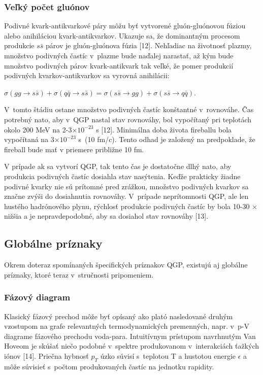\subsubsection{Veľký počet gluónov}
Podivné kvark-antikvarkové páry môžu byť vytvorené
gluón-gluónovou fúziou alebo anihiláciou kvark-antikvarkov.
Ukazuje sa, že dominantným
procesom produkcie $s\bar{s}$ párov je gluón-gluónova fúzia [12].
Nehľadiac na životnosť plazmy, množstvo podivných
častíc v~plazme bude naďalej narastať, až kým bude
množstvo podivných párov kvark-antikvark tak veľké, že
pomer produkcií podivných kvarkov-antikvarkov  sa vyrovná anihilácii:
\begin{center}
  $\sigma(gg \rightarrow s\bar{s}) + \sigma(q\bar{q} \rightarrow s\bar{s}) =
  \sigma(s\bar{s} \rightarrow gg) + \sigma(s\bar{s} \rightarrow q\bar{q})$.
\end{center}
V~tomto štádiu ostane množstvo podivných častíc
konštantné v~rovnováhe. Čas potrebný nato, aby v~QGP nastal
stav rovnováhy, bol vypočítaný pri teplotách okolo 200 MeV  na
2-3$\times 10^{-23}$ s [12]. Minimálna doba života fireballu bola
vypočítaná na  3$\times 10^{-23}$ s~(10 fm/c). Tento odhad
je založený na predpoklade, že fireball bude mať v
priemere približne 10 fm.

V prípade ak sa vytvorí QGP, tak
tento čas je dostatočne dlhý nato, aby produkcia podivných
častíc dosiahla stav nasýtenia.  Keďže prakticky
žiadne podivné kvarky nie sú prítomné pred zrážkou,
množstvo podivných kvarkov sa značne zvýši do dosiahnutia
rovnováhy. V~prípade neprítomnosti QGP, ale len hustého
hadrónového plynu, rýchlosť produkcie podivných častíc
by bola 10-30 $\times$ nižšia a je nepravdepodobné, aby sa dosiahol
stav rovnováhy [13].

\subsection{Globálne príznaky}
Okrem doteraz spomínaných špecifických príznakov QGP,
existujú aj globálne príznaky, ktoré teraz v~stručnosti
pripomeniem.
\subsubsection{Fázový diagram}
Klasický fázový prechod môže byť opísaný ako plató
nasledované druhým vzostupom na grafe relevantných termodynamických
premenných, napr. v~p-V diagrame fázového prechodu voda-para.
Intuitívnym prístupom navrhnutým Van Hoveom je skúšať
niečo podobné v~spektre produkovanom v~interakciách ťažkých
iónov [14]. Priečna hybnosť $p_{T}$  úzko
súvisí s~teplotou T a hustotou energie $\epsilon$ a môže
súvisieť s~počtom produkovaných častíc na jednotku
rapidity.

